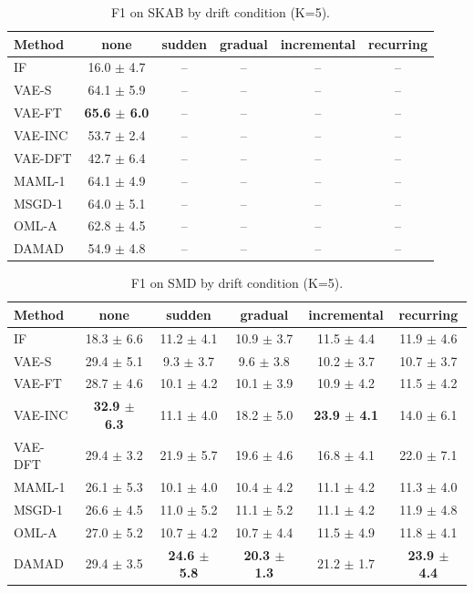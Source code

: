 \begin{table}[t]
\centering
\small
\caption{F1 on SKAB by drift condition (K=5).}
\label{tab:drift_f1_skab}
\begin{tabular}{lccccc}
\toprule
Method & none & sudden & gradual & incremental & recurring \\
\midrule
IF & 16.0 $\pm$ 4.7 & – & – & – & – \\
VAE-S & 64.1 $\pm$ 5.9 & – & – & – & – \\
VAE-FT & \textbf{65.6 $\pm$ 6.0} & – & – & – & – \\
VAE-INC & 53.7 $\pm$ 2.4 & – & – & – & – \\
VAE-DFT & 42.7 $\pm$ 6.4 & – & – & – & – \\
MAML-1 & 64.1 $\pm$ 4.9 & – & – & – & – \\
MSGD-1 & 64.0 $\pm$ 5.1 & – & – & – & – \\
OML-A & 62.8 $\pm$ 4.5 & – & – & – & – \\
DAMAD & 54.9 $\pm$ 4.8 & – & – & – & – \\
\bottomrule
\end{tabular}
\end{table}

\begin{table}[t]
\centering
\small
\caption{F1 on SMD by drift condition (K=5).}
\label{tab:drift_f1_smd}
\begin{tabular}{lccccc}
\toprule
Method & none & sudden & gradual & incremental & recurring \\
\midrule
IF & 18.3 $\pm$ 6.6 & 11.2 $\pm$ 4.1 & 10.9 $\pm$ 3.7 & 11.5 $\pm$ 4.4 & 11.9 $\pm$ 4.6 \\
VAE-S & 29.4 $\pm$ 5.1 & 9.3 $\pm$ 3.7 & 9.6 $\pm$ 3.8 & 10.2 $\pm$ 3.7 & 10.7 $\pm$ 3.7 \\
VAE-FT & 28.7 $\pm$ 4.6 & 10.1 $\pm$ 4.2 & 10.1 $\pm$ 3.9 & 10.9 $\pm$ 4.2 & 11.5 $\pm$ 4.2 \\
VAE-INC & \textbf{32.9 $\pm$ 6.3} & 11.1 $\pm$ 4.0 & 18.2 $\pm$ 5.0 & \textbf{23.9 $\pm$ 4.1} & 14.0 $\pm$ 6.1 \\
VAE-DFT & 29.4 $\pm$ 3.2 & 21.9 $\pm$ 5.7 & 19.6 $\pm$ 4.6 & 16.8 $\pm$ 4.1 & 22.0 $\pm$ 7.1 \\
MAML-1 & 26.1 $\pm$ 5.3 & 10.1 $\pm$ 4.0 & 10.4 $\pm$ 4.2 & 11.1 $\pm$ 4.2 & 11.3 $\pm$ 4.0 \\
MSGD-1 & 26.6 $\pm$ 4.5 & 11.0 $\pm$ 5.2 & 11.1 $\pm$ 5.2 & 11.1 $\pm$ 4.2 & 11.9 $\pm$ 4.8 \\
OML-A & 27.0 $\pm$ 5.2 & 10.7 $\pm$ 4.2 & 10.7 $\pm$ 4.4 & 11.5 $\pm$ 4.9 & 11.8 $\pm$ 4.1 \\
DAMAD & 29.4 $\pm$ 3.5 & \textbf{24.6 $\pm$ 5.8} & \textbf{20.3 $\pm$ 1.3} & 21.2 $\pm$ 1.7 & \textbf{23.9 $\pm$ 4.4} \\
\bottomrule
\end{tabular}
\end{table}

